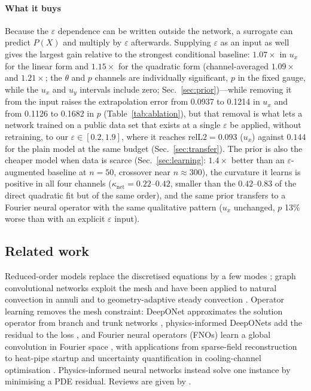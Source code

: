 \documentclass[preprint,11pt,a4paper,times,doubleblind]{elsarticle}
\begin{document}
\paragraph{What it buys} Because the $\varepsilon$ dependence can be written outside the network, a
surrogate can predict $P(X)$ and multiply by $\varepsilon$ afterwards. Supplying $\varepsilon$ as
an input as well gives the largest gain relative to the strongest conditional baseline:
$1.07\times$ in $u_x$ for the linear form and $1.15\times$ for the quadratic form
(channel-averaged $1.09\times$ and $1.21\times$; the $\theta$ and $p$ channels are individually
significant, $p$ in the fixed gauge, while the $u_x$ and $u_y$ intervals include zero;
Sec.~\ref{sec:prior})---while removing it from
the input raises the extrapolation error from 0.0937 to 0.1214 in $u_x$ and from 0.1126 to 0.1682 in
$p$ (Table~\ref{tab:ablation}), but that removal
is what lets a network trained on a public data set that exists at a single $\varepsilon$ be
applied, without retraining, to our $\varepsilon\in[0.2,1.9]$, where it reaches
$\mathrm{relL2}=0.093$ ($u_x$) against $0.144$ for the plain model at the same budget
(Sec.~\ref{sec:transfer}). The prior is also the cheaper model when data is scarce
(Sec.~\ref{sec:learning}: $1.4\times$ better than an $\varepsilon$-augmented baseline at $n=50$,
crossover near $n\approx300$), the curvature it learns is positive in all four channels ($\kappa_{\mathrm{net}}=0.22$--$0.42$,
smaller than the $0.42$--$0.83$ of the direct quadratic fit but of the same order), and the same
prior transfers to a Fourier neural operator with the same qualitative pattern ($u_x$ unchanged,
$p$ 13\% worse than with an explicit $\varepsilon$ input).

\subsection{Related work}
\label{sec:related}

Reduced-order models replace the discretised equations by a few modes
\citep{huhn2022parametric}; graph convolutional networks exploit the mesh and have been applied to
natural convection in annuli \citep{feng2024graph} and to geometry-adaptive steady convection
\citep{peng2023physics}. Operator learning removes the mesh constraint: DeepONet approximates the
solution operator from branch and trunk networks \citep{lu2021learning}, physics-informed DeepONets
add the residual to the loss \citep{wang2021learning}, and Fourier neural operators (FNOs) learn a
global convolution in Fourier space \citep{li2021fourier}, with applications from sparse-field
reconstruction \citep{zhao2023recfno} to heat-pipe startup \citep{yu2026fourier} and uncertainty
quantification in cooling-channel optimisation \citep{sahin2023deep}. Physics-informed neural
networks \citep{raissi2019physics,cai2021physics,jalili2023physics} instead solve one instance by
minimising a PDE residual. Reviews are given by
\citet{deryck2024numerical,meng2025physics,luo2025physics}.
\end{document}
